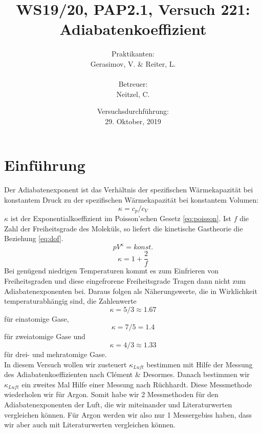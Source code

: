\documentclass[a4paper,10pt]{article}
\title{WS19/20, PAP2.1, Versuch 221:\\ Adiabatenkoeffizient}
\date{Versuchsdurchführung: \\29. Oktober, 2019}
\author{Praktikanten:\\Gerasimov, V. \& Reiter, L.\\\\Betreuer:\\ Neitzel, C.}
\begin{document}
\maketitle

\newpage

\tableofcontents


\section{Einführung}\boldmath
Der Adiabatenexponent ist das Verhältnis der spezifischen Wärmekapazität bei konstantem Druck zu der spezifischen Wärmekapazität bei konstantem Volumen:
\begin{equation}
\kappa=c_p / c_V
\end{equation}
\(\kappa\) ist der Exponentialkoeffizient im Poisson'schen Gesetz \eqref{eq:poisson}. Ist \(f\) die Zahl der Freiheitsgrade des Moleküls, so liefert die kinetische Gastheorie die Beziehung \eqref{eq:dof}.
\begin{equation}\label{eq:poisson}
\boxed{p V^{\kappa} = konst.}
\end{equation}
\begin{equation}\label{eq:dof}
\kappa= 1 + \frac{2}{f}
\end{equation}
Bei genügend niedrigen Temperaturen kommt es zum Einfrieren von Freiheitsgraden und diese  eingefrorene Freiheitsgrade Tragen dann nicht zum Adiabatenexponenten bei. Daraus folgen als Näherungswerte, die in Wirklichkeit temperaturabhängig sind, die Zahlenwerte
\[\kappa = 5/3 \approx 1.67\]
für einatomige Gase,
\[\kappa = 7/5 = 1.4\]
für zweiatomige Gase und
\[\kappa = 4/3 \approx 1.33\]
für drei- und mehratomige Gase.\\
In diesem Versuch wollen wir zusteuert \(\kappa_{Luft}\) bestimmen mit Hilfe der Messung des Adiabatenkoeffizienten nach Clément \& Desormes.
Danach bestimmen wir \(\kappa_{Luft}\) ein zweites Mal Hilfe einer Messung nach Rüchhardt. Diese Messmethode wiederholen wir für Argon. Somit habe wir 2 Messmethoden für den Adiabatenexponenten der Luft, die wir miteinander und Literaturwerten vergleichen können. Für Argon werden wir also nur 1 Messergebiss haben, dass wir aber auch mit Literaturwerten vergleichen können.
\end{document}
